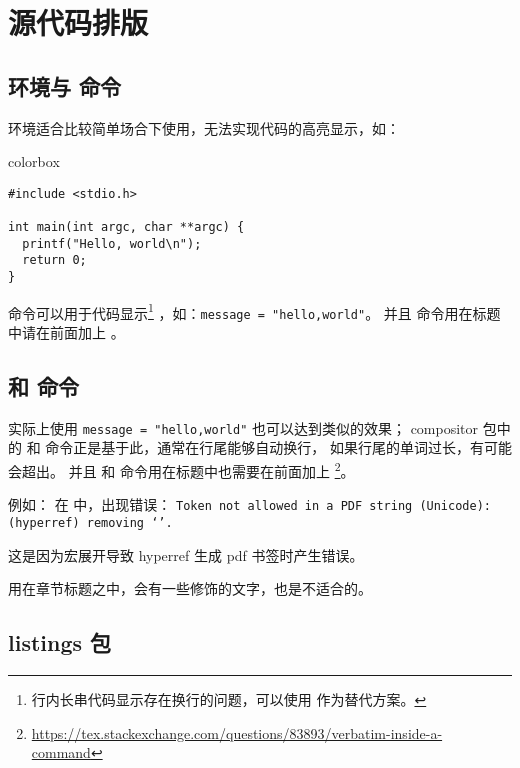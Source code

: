 \chapter{源代码排版}

\section{\protect{} 环境与 \protect{} 命令}

 环境适合比较简单场合下使用，无法实现代码的高亮显示，如：

\begin{latexcode}{colorbox}
\begin{verbatim}
#include <stdio.h>

int main(int argc, char **argc) {
  printf("Hello, world\n");
  return 0;
}
\end{verbatim}
\end{latexcode}

 命令可以用于代码显示\footnote{行内长串代码显示存在换行的问题，可以使用  作为替代方案。}
，如：\texttt{\verb|message = "hello,world"|}。
并且  命令用在标题中请在前面加上 。

\section{\protect{} 和 \protect{} 命令}

实际上使用 \texttt{{\tffamily message = "hello,world"}} 也可以达到类似的效果；
compositor 包中的  和  命令正是基于此，通常在行尾能够自动换行，
如果行尾的单词过长，有可能会超出。
并且  和  命令用在标题中也需要在前面加上 
\footnote{\url{https://tex.stackexchange.com/questions/83893/verbatim-inside-a-command}}。

例如： 在   中，出现错误：
\texttt{Token not allowed in a PDF string (Unicode): (hyperref) removing `\new@ifnextchar'.} 

这是因为宏展开导致 hyperref 生成 pdf 书签时产生错误。

\begin{remark*}
 用在章节标题之中，会有一些修饰的文字，也是不适合的。
\end{remark*}

\section{listings 包}

